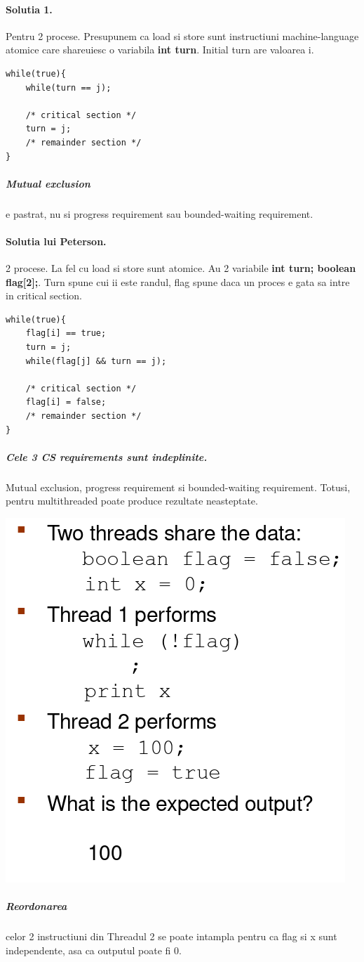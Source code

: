 \documentclass{article}
\begin{document}
\paragraph*{Solutia 1.} Pentru 2 procese. Presupunem ca load si store sunt instructiuni machine-language atomice care shareuiesc o variabila \textbf{int turn}. Initial turn are valoarea i.
\begin{lstlisting}
while(true){
    while(turn == j);

    /* critical section */
    turn = j;
    /* remainder section */
}
\end{lstlisting}
\subparagraph*{Mutual exclusion} e pastrat, nu si progress requirement sau bounded-waiting requirement.
\paragraph*{Solutia lui Peterson.} 2 procese. La fel cu load si store sunt atomice. Au 2 variabile \textbf{int turn; boolean flag[2];}. Turn spune cui ii este randul, flag spune daca un proces e gata sa intre in critical section.

\begin{lstlisting}
while(true){
    flag[i] == true;
    turn = j;
    while(flag[j] && turn == j);

    /* critical section */
    flag[i] = false;
    /* remainder section */
}
\end{lstlisting}
\subparagraph*{Cele 3 CS requirements sunt indeplinite.} Mutual exclusion, progress requirement si bounded-waiting requirement. Totusi, pentru multithreaded poate produce rezultate neasteptate.

\begin{center}
    \includegraphics[scale=0.3]{14_peterson2threads.png}
\end{center}
\subparagraph*{Reordonarea} celor 2 instructiuni din Threadul 2 se poate intampla pentru ca flag si x sunt independente, asa ca outputul poate fi 0.
\end{document}
